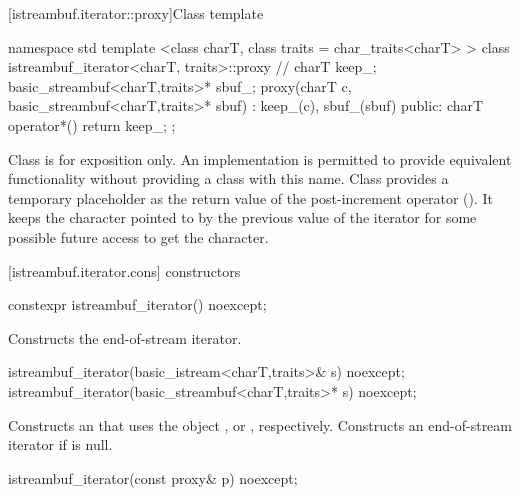 [istreambuf.iterator::proxy]{Class template }

%
\begin{codeblock}
namespace std {
  template <class charT, class traits = char_traits<charT> >
  class istreambuf_iterator<charT, traits>::proxy { // \expos
    charT keep_;
    basic_streambuf<charT,traits>* sbuf_;
    proxy(charT c, basic_streambuf<charT,traits>* sbuf)
      : keep_(c), sbuf_(sbuf) { }
  public:
    charT operator*() { return keep_; }
  };
}
\end{codeblock}

\pnum
Class
is for exposition only.
An implementation is permitted to provide equivalent functionality without
providing a class with this name.
Class
provides a temporary
placeholder as the return value of the post-increment operator
().
It keeps the character pointed to by the previous value
of the iterator for some possible future access to get the character.

[istreambuf.iterator.cons]{ constructors}


%
\begin{itemdecl}
constexpr istreambuf_iterator() noexcept;
\end{itemdecl}

\begin{itemdescr}
\pnum
\effects
Constructs the end-of-stream iterator.
\end{itemdescr}


%
\begin{itemdecl}
istreambuf_iterator(basic_istream<charT,traits>& s) noexcept;
istreambuf_iterator(basic_streambuf<charT,traits>* s) noexcept;
\end{itemdecl}

\begin{itemdescr}
\pnum
\effects
Constructs an
that uses the
object
,
or
,
respectively.
Constructs an end-of-stream iterator if
is null.
\end{itemdescr}


%
\begin{itemdecl}
istreambuf_iterator(const proxy& p) noexcept;
\end{itemdecl}

